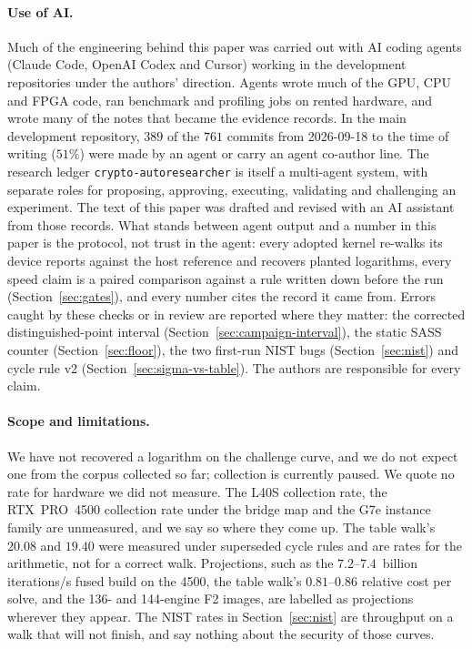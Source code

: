 \paragraph{Use of AI.} Much of the engineering behind this paper was
carried out with AI coding agents (Claude Code, OpenAI Codex and Cursor)
working in the development repositories under the authors' direction.
Agents wrote much of the GPU, CPU and FPGA code, ran benchmark and
profiling jobs on rented hardware, and wrote many of the notes that
became the evidence records. In the main development repository, $389$ of the
$761$ commits from 2026-09-18 to the time of writing ($51\%$) were made
by an agent or carry an agent co-author line. The research ledger
\texttt{crypto-autoresearcher} is itself a multi-agent system, with
separate roles for proposing, approving, executing, validating and
challenging an experiment. The text of this paper was drafted and
revised with an AI assistant from those records. What stands between
agent output and a number in this paper is the protocol, not trust in
the agent: every adopted kernel re-walks its device reports against the
host reference and recovers planted logarithms, every speed claim is a
paired comparison against a rule written down before the run
(Section~\ref{sec:gates}), and every number cites the record it came
from. Errors caught by these checks or in review are reported where they
matter: the corrected distinguished-point interval
(Section~\ref{sec:campaign-interval}), the static SASS counter
(Section~\ref{sec:floor}), the two first-run NIST bugs
(Section~\ref{sec:nist}) and cycle rule v2
(Section~\ref{sec:sigma-vs-table}). The authors are responsible for every
claim.

\paragraph{Scope and limitations.} We have not recovered a logarithm on
the challenge curve, and we do not expect one from the corpus
collected so far; collection is currently paused. We quote no rate for
hardware we did not measure. The L40S collection rate, the RTX~PRO~4500
collection rate under the bridge map and the G7e instance family are
unmeasured, and we say so where they come up. The table walk's
$20.08$ and $19.40$ were measured under superseded cycle rules and are
rates for the arithmetic, not for a correct walk. Projections, such as
the $7.2$--$7.4$~billion iterations/s fused build on the 4500, the table walk's
$0.81$--$0.86$ relative cost per solve, and the 136- and 144-engine F2
images, are labelled as projections wherever they appear. The NIST
rates in Section~\ref{sec:nist} are throughput on a walk that will not
finish, and say nothing about the security of those curves.
